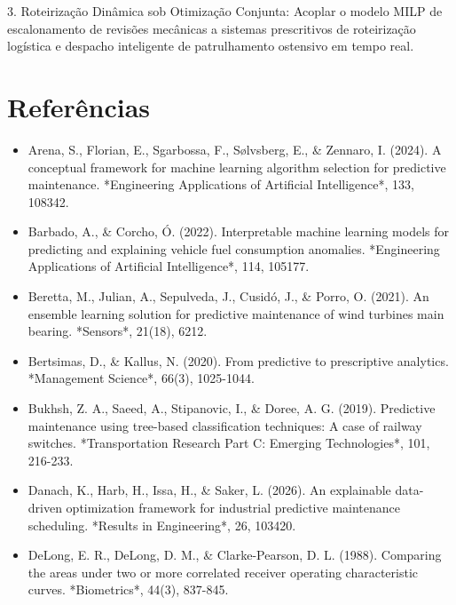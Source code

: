 \documentclass[10pt,a4paper,journal]{article}
\begin{document}
3. Roteirização Dinâmica sob Otimização Conjunta: Acoplar o modelo MILP de escalonamento de revisões mecânicas a sistemas prescritivos de roteirização logística e despacho inteligente de patrulhamento ostensivo em tempo real.

\section{Referências}
\begin{itemize}
\item Arena, S., Florian, E., Sgarbossa, F., Sølvsberg, E., \& Zennaro, I. (2024). A conceptual framework for machine learning algorithm selection for predictive maintenance. *Engineering Applications of Artificial Intelligence*, 133, 108342.
\end{itemize}
\begin{itemize}
\item Barbado, A., \& Corcho, Ó. (2022). Interpretable machine learning models for predicting and explaining vehicle fuel consumption anomalies. *Engineering Applications of Artificial Intelligence*, 114, 105177.
\end{itemize}
\begin{itemize}
\item Beretta, M., Julian, A., Sepulveda, J., Cusidó, J., \& Porro, O. (2021). An ensemble learning solution for predictive maintenance of wind turbines main bearing. *Sensors*, 21(18), 6212.
\end{itemize}
\begin{itemize}
\item Bertsimas, D., \& Kallus, N. (2020). From predictive to prescriptive analytics. *Management Science*, 66(3), 1025-1044.
\end{itemize}
\begin{itemize}
\item Bukhsh, Z. A., Saeed, A., Stipanovic, I., \& Doree, A. G. (2019). Predictive maintenance using tree-based classification techniques: A case of railway switches. *Transportation Research Part C: Emerging Technologies*, 101, 216-233.
\end{itemize}
\begin{itemize}
\item Danach, K., Harb, H., Issa, H., \& Saker, L. (2026). An explainable data-driven optimization framework for industrial predictive maintenance scheduling. *Results in Engineering*, 26, 103420.
\end{itemize}
\begin{itemize}
\item DeLong, E. R., DeLong, D. M., \& Clarke-Pearson, D. L. (1988). Comparing the areas under two or more correlated receiver operating characteristic curves. *Biometrics*, 44(3), 837-845.
\end{itemize}
\end{document}
